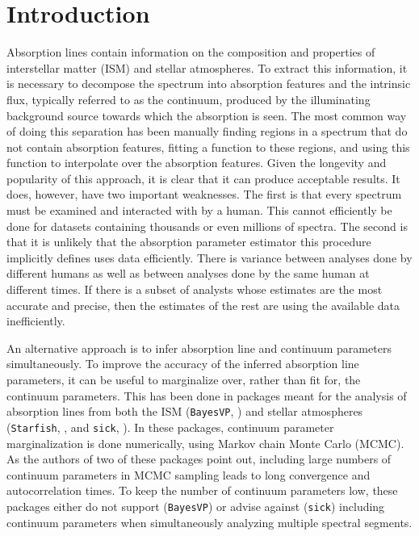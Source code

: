 \documentclass[trackchanges]{aastex62}
\begin{document}
\section{Introduction}
\label{sec:introduction}
Absorption lines contain information on the composition and properties of interstellar matter (ISM) and stellar atmospheres.
To extract this information, it is necessary to decompose the spectrum into absorption features and the intrinsic flux, typically referred to as the continuum, produced by the illuminating background source towards which the absorption is seen.
The most common way of doing this separation has been manually finding regions in a spectrum that do not contain absorption features, fitting a function to these regions, and using this function to interpolate over the absorption features.
Given the longevity and popularity of this approach, it is clear that it can produce acceptable results.
It does, however, have two important weaknesses.
The first is that every spectrum must be examined and interacted with by a human.
This cannot efficiently be done for datasets containing thousands or even millions of spectra.
The second is that it is unlikely that the absorption parameter estimator this procedure implicitly defines uses data efficiently.
There is variance between analyses done by different humans as well as between analyses done by the same human at different times.
If there is a subset of analysts whose estimates are the most accurate and precise, then the estimates of the rest are using the available data inefficiently.

An alternative approach is to infer absorption line and continuum parameters simultaneously.
To improve the accuracy of the inferred absorption line parameters, it can be useful to marginalize over, rather than fit for, the continuum parameters.
This has been done in packages meant for the analysis of absorption lines from both the ISM (\texttt{BayesVP}, \citealt{Liang:2018kq}) and stellar atmospheres (\texttt{Starfish}, \citealt{2015ApJ...812..128C}, and \texttt{sick}, \citealt{2016ApJS..223....8C}).
In these packages, continuum parameter marginalization is done numerically, using Markov chain Monte Carlo (MCMC).
As the authors of two of these packages point out, including large numbers of continuum parameters in MCMC sampling leads to long convergence and autocorrelation times.
To keep the number of continuum parameters low, these packages either do not support (\texttt{BayesVP}) or advise against (\texttt{sick}) including continuum parameters when simultaneously analyzing multiple spectral segments.
\end{document}
